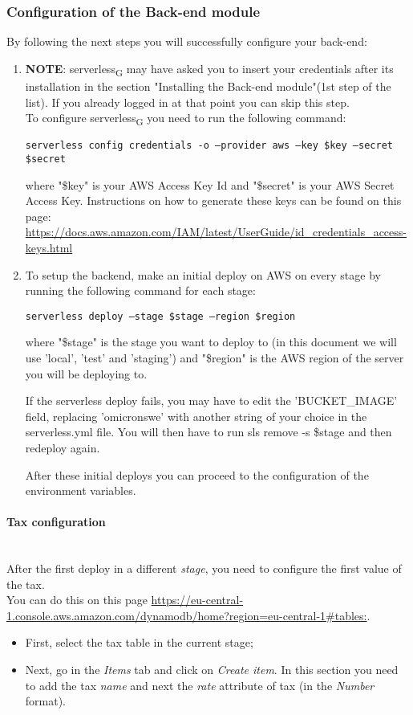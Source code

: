 \subsubsection{Configuration of the Back-end module}
By following the next steps you will successfully configure your back-end:
\begin{enumerate}
\item \textbf{NOTE}: serverless\textsubscript{G} may have asked you to insert your credentials after its installation in the section "Installing the Back-end module"(1st step of the list). If you already logged in at that point you can skip this step.\\ 
To configure serverless\textsubscript{G} you need to run the following command:
\begin{center}
\texttt{serverless config credentials -o --provider aws --key \$key --secret \$secret}
\end{center}
where "\$key" is your AWS Access Key Id and "\$secret" is your AWS Secret Access Key.
Instructions on how to generate these keys can be found on this page: \url{https://docs.aws.amazon.com/IAM/latest/UserGuide/id_credentials_access-keys.html}

\item To setup the backend, make an initial deploy on AWS on every stage by running the following command for each stage:
\begin{center}
\texttt{serverless deploy --stage \$stage --region \$region}
\end{center}
where "\$stage" is the stage you want to deploy to (in this document we will use 'local', 'test' and 'staging') and "\$region" is the AWS region of the server you will be deploying to.

If the serverless deploy fails, you may have to edit the 'BUCKET\_IMAGE' field, replacing 'omicronswe' with another string of your choice in the serverless.yml file. You will then have to run sls remove -s \$stage and then redeploy again.

After these initial deploys you can proceed to the configuration of the environment variables.
\end{enumerate}

\paragraph{Tax configuration}\mbox{}\\
After the first deploy in a different \textit{stage}, you need to configure the first value of the tax.\\
You can do this on this page \url{https://eu-central-1.console.aws.amazon.com/dynamodb/home?region=eu-central-1#tables:}.
\begin{itemize}
	\item First, select the tax table in the current stage;
	\item Next, go in the \textit{Items} tab and click on \textit{Create item}. In this section you need to add the tax \textit{name} and next the \textit{rate} attribute of tax (in the \textit{Number} format).
\end{itemize}

